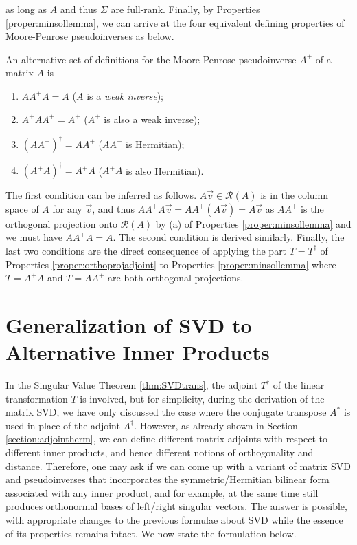 as long as $A$ and thus $\Sigma$ are full-rank. Finally, by Properties \ref{proper:minsollemma}, we can arrive at the four equivalent defining properties of Moore-Penrose pseudoinverses as below.
\begin{proper}
\label{proper:pinvequiv}
An alternative set of definitions for the Moore-Penrose pseudoinverse $A^+$ of a matrix $A$ is
\begin{enumerate}
    \item $AA^+A = A$ ($A$ is a \textit{weak inverse});
    \item $A^+AA^+ = A^+$ ($A^+$ is also a weak inverse);
    \item $(AA^+)^\dag = AA^+$ ($AA^+$ is Hermitian);
    \item $(A^+A)^\dag = A^+A$ ($A^+A$ is also Hermitian).
\end{enumerate}
\end{proper}
The first condition can be inferred as follows. $A\vec{v} \in \mathcal{R}(A)$ is in the column space of $A$ for any $\vec{v}$, and thus $AA^+A\vec{v} = AA^+(A\vec{v}) = A\vec{v}$ as $AA^+$ is the orthogonal projection onto $\mathcal{R}(A)$ by (a) of Properties \ref{proper:minsollemma} and we must have $AA^+A = A$. The second condition is derived similarly. Finally, the last two conditions are the direct consequence of applying the part $T = T^\dag$ of Properties \ref{proper:orthoprojadjoint} to Properties \ref{proper:minsollemma} where $T = A^+A$ and $T= AA^+$ are both orthogonal projections.

\section{Generalization of SVD to Alternative Inner Products}
\label{section:SVDgeneral}

In the Singular Value Theorem \ref{thm:SVDtrans}, the adjoint $T^\dag$ of the linear transformation $T$ is involved, but for simplicity, during the derivation of the matrix SVD, we have only discussed the case where the conjugate transpose $A^*$ is used in place of the adjoint $A^\dag$. However, as already shown in Section \ref{section:adjointherm}, we can define different matrix adjoints with respect to different inner products, and hence different notions of orthogonality and distance. Therefore, one may ask if we can come up with a variant of matrix SVD and pseudoinverses that incorporates the symmetric/Hermitian bilinear form associated with any inner product, and for example, at the same time still produces orthonormal bases of left/right singular vectors. The answer is possible, with appropriate changes to the previous formulae about SVD while the essence of its properties remains intact. We now state the formulation below.

